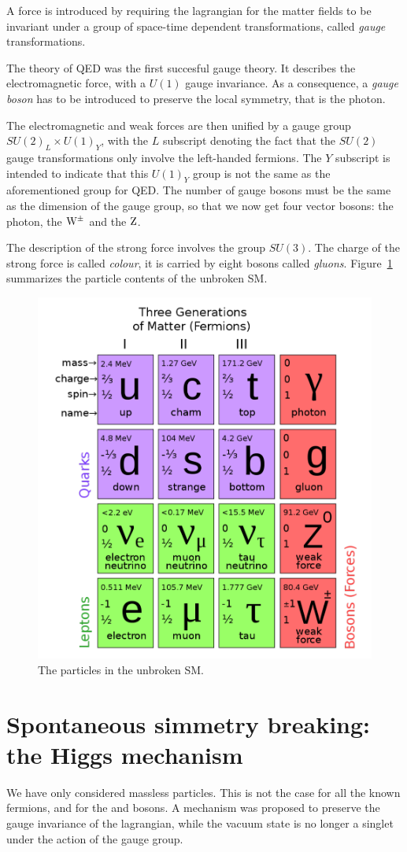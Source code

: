 A force is introduced by requiring the lagrangian for the matter fields to
be invariant under a group of space-time dependent transformations, called
\emph{gauge} transformations.

The theory of QED was the first succesful gauge theory.
It describes the electromagnetic force, with a $U(1)$ gauge
invariance. As a consequence, a \emph{gauge boson} has to be introduced to preserve
the local symmetry, that is the photon.

The electromagnetic and weak forces are then unified by a gauge group
$SU(2)_L \times U(1)_Y$, with the $L$ subscript denoting the fact that the
$SU(2)$ gauge transformations only involve the left-handed fermions.
The $Y$ subscript is intended to indicate that this $U(1)_Y$ group is not
the same as the aforementioned group for QED.
The number of gauge bosons must be the same as the dimension of the gauge
group, so that we now get four vector bosons: the photon, the $\mathrm{W}^\pm$ and
the $\mathrm{Z}$.

The description of the strong force involves the group $SU(3)$.
The charge of the strong force is called \emph{colour}, it is carried by eight bosons called \emph{gluons}.
Figure~\ref{fig:sm_particles} summarizes the particle contents of the
unbroken SM.

\begin{figure}[htb]
    \centering
    \includegraphics[width=.7\textwidth]{images/pdf/sm_particles}
    \caption{The particles in the unbroken SM.}
    \label{fig:sm_particles}
\end{figure}

\section{Spontaneous simmetry breaking: the Higgs mechanism}
We have only considered massless particles. This is not the case for all
the known fermions, and for the \W and \Z bosons. A mechanism was proposed
to preserve the gauge invariance of the lagrangian, while the vacuum state
is no longer a singlet under the action of the gauge group.

